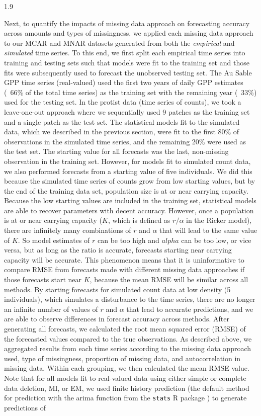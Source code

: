 \documentclass[12pt,english]{article} %
\begin{document}
\begin{linenumbers}
\begin{spacing}{1.9}
\begin{flushleft}
\hspace{1em} Next, to quantify the impacts of missing data approach on forecasting accuracy across amounts and types of missingness, we applied each missing data approach to our MCAR and MNAR datasets generated from both the \textit{empirical}  and \textit{simulated} time series. To this end, we first split each empirical time series into training and testing sets such that models were fit to the training set and those fits were subsequently used to forecast the unobserved testing set. The Au Sable GPP time series (real-valued) used the first two years of daily GPP estimates (~66\% of the total time series) as the training set with the remaining year (~33\%) used for the testing set. In the protist data (time series of counts), we took a leave-one-out approach where we sequentially used 9 patches as the training set and a single patch as the test set. The statistical models fit to the simulated data, which we described in the previous section, were fit to the first 80\% of observations in the simulated time series, and the remaining 20\% were used as the test set. The starting value for all forecasts was the last, non-missing observation in the training set. However, for models fit to simulated count data, we also performed forecasts from a starting value of five individuals. We did this because the simulated time series of counts grow from low starting values, but by the end of the training data set, population size is at or near carrying capacity. Because the low starting values are included in the training set, statistical models are able to recover parameters with decent accuracy. However, once a population is at or near carrying capacity ($K$, which is defined as $r/\alpha$ in the Ricker model), there are infinitely many combinations of $r$ and $\alpha$ that will lead to the same value of $K$. So model estimates of $r$ can be too high and $alpha$ can be too low, or vice versa, but as long as the ratio is accurate, forecasts starting near carrying capacity will be accurate. This phenomenon means that it is uninformative to compare RMSE from forecasts made with different missing data approaches if those forecasts start near $K$, because the mean RMSE will be similar across all methods. By starting forecasts for simulated count data at low density (5 individuals), which simulates a disturbance to the time series, there are no longer an infinite number of values of $r$ and $\alpha$ that lead to accurate predictions, and we are able to observe differences in forecast accuracy across methods. After generating all forecasts, we calculated the root mean squared error (RMSE) of the forecasted values compared to the true observations. As described above, we aggregated results from each time series according to the missing data approach used, type of missingness, proportion of missing data, and autocorrelation in missing data. Within each grouping, we then calculated the mean RMSE value. Note that for all models fit to real-valued data using either simple or complete data deletion, MI, or EM, we used finite history prediction (the default method for prediction with the arima function from the \texttt{stats} R package \citep{r_2021}) to generate predictions of 
\end{flushleft}
\end{spacing}
\end{linenumbers}
\end{document}

